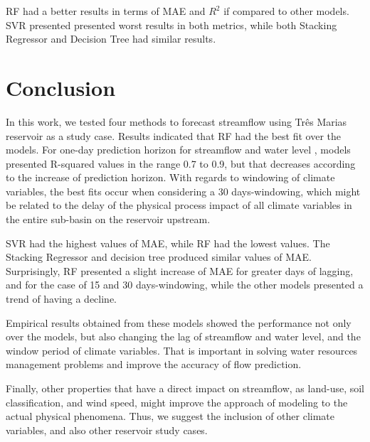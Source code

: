 \documentclass[12pt]{article}
\begin{document}
RF had a better results in terms of MAE and $R^2$ if compared to other models. SVR presented presented worst results in both metrics, while both Stacking Regressor and Decision Tree had similar results.

\section{Conclusion}

In this work, we tested four methods to forecast streamflow using Três Marias reservoir as a study case. Results indicated that RF had the best fit over the models.  For one-day prediction horizon for streamflow and water level , models presented R-squared values in the range 0.7 to 0.9, but that decreases according to the increase of  prediction horizon. With regards to windowing of climate variables, the best fits occur when considering a 30 days-windowing, which might be related to the delay of the physical process impact of all climate variables in the entire sub-basin on the reservoir upstream.

SVR had the highest values of MAE, while RF had the lowest values. The Stacking Regressor and decision tree produced similar values of MAE. Surprisingly, RF presented a slight increase of MAE for greater days of lagging, and for the case of 15 and 30 days-windowing, while the other models presented a trend of having a decline.

Empirical results obtained from these models showed the performance not only over the models, but also changing the lag of streamflow and water level, and the window period of climate variables. That is important in solving water resources management problems and improve the accuracy of flow prediction.

Finally, other properties that have a direct impact on streamflow, as land-use, soil classification, and wind speed, might improve the approach of modeling to the actual physical phenomena. Thus, we suggest the inclusion of other climate variables, and also other reservoir study cases.










\appendix

\end{document}
